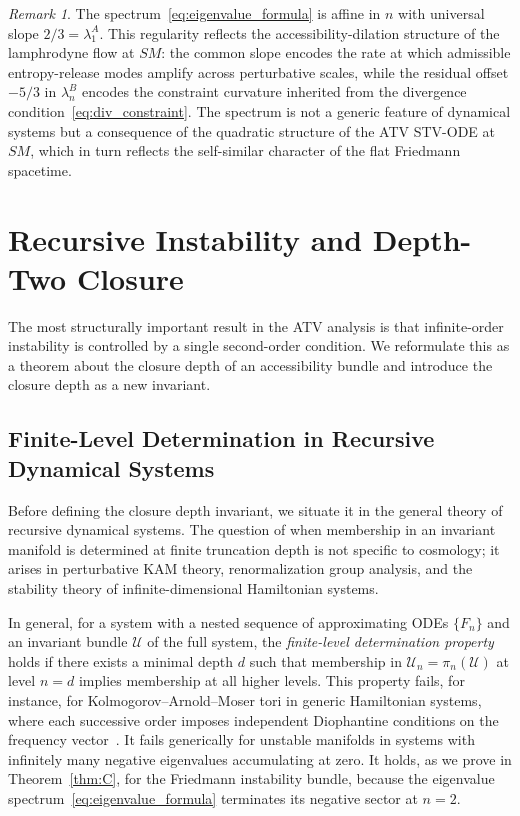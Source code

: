 \documentclass[12pt,a4paper]{article}
\theoremstyle{plain}
\theoremstyle{definition}
\theoremstyle{remark}
\newtheorem{remark}[theorem]{Remark}
\newcommand{\piproj}{\pi}
\newcommand{\SM}{\mathit{SM}}
\newcommand{\lAn}[1]{\lambda^A_{#1}}
\newcommand{\lBn}[1]{\lambda^B_{#1}}
\begin{document}
\begin{remark}
The spectrum~\eqref{eq:eigenvalue_formula} is affine in $n$ with universal slope
$2/3 = \lAn{1}$. This regularity reflects the accessibility-dilation structure
of the lamphrodyne flow at $\SM$: the common slope encodes the rate at which
admissible entropy-release modes amplify across perturbative scales, while the
residual offset $-5/3$ in $\lBn{n}$ encodes the constraint curvature inherited
from the divergence condition~\eqref{eq:div_constraint}. The spectrum is not a
generic feature of dynamical systems but a consequence of the quadratic structure
of the ATV STV-ODE at $\SM$, which in turn reflects the self-similar character
of the flat Friedmann spacetime.
\end{remark}

\section{Recursive Instability and Depth-Two Closure}
\label{sec:closure}

The most structurally important result in the ATV analysis is that infinite-order
instability is controlled by a single second-order condition. We reformulate this
as a theorem about the closure depth of an accessibility bundle and introduce the
closure depth as a new invariant.

\subsection{Finite-Level Determination in Recursive Dynamical Systems}
\label{subsec:finitelevel}

Before defining the closure depth invariant, we situate it in the general theory
of recursive dynamical systems. The question of when membership in an invariant
manifold is determined at finite truncation depth is not specific to cosmology;
it arises in perturbative KAM theory, renormalization group analysis, and the
stability theory of infinite-dimensional Hamiltonian systems.

In general, for a system with a nested sequence of approximating ODEs $\{F_n\}$
and an invariant bundle $\mathcal{U}$ of the full system, the \emph{finite-level
determination property} holds if there exists a minimal depth $d$ such that
membership in $\mathcal{U}_n = \piproj_n(\mathcal{U})$ at level $n = d$ implies
membership at all higher levels. This property fails, for instance, for
Kolmogorov--Arnold--Moser tori in generic Hamiltonian systems, where each successive
order imposes independent Diophantine conditions on the frequency vector~\cite{Arnold1989}.
It fails generically for unstable manifolds in systems with infinitely many negative
eigenvalues accumulating at zero. It holds, as we prove in Theorem~\ref{thm:C},
for the Friedmann instability bundle, because the eigenvalue spectrum~\eqref{eq:eigenvalue_formula}
terminates its negative sector at $n = 2$.
\end{document}

